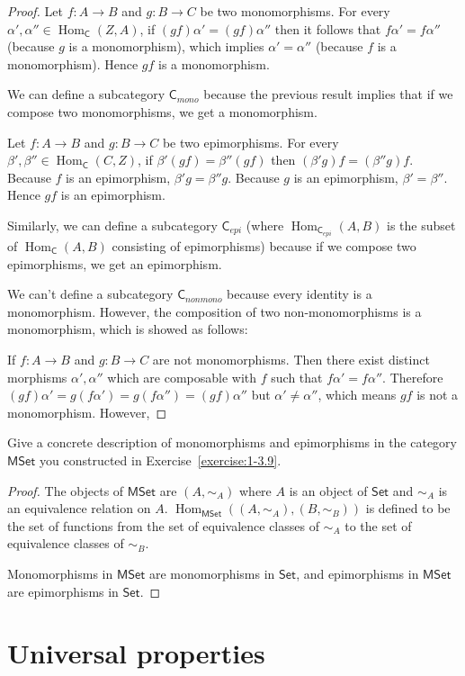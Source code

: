 \begin{proof}
	Let $f: A\to B$ and $g: B\to C$ be two monomorphisms. For every $\alpha', \alpha'' \in \operatorname{Hom}_{\mathsf{C}}(Z, A)$, if $(gf)\alpha' = (gf)\alpha''$ then it follows that $f\alpha' = f\alpha''$ (because $g$ is a monomorphism), which implies $\alpha' = \alpha''$ (because $f$ is a monomorphism). Hence $gf$ is a monomorphism.

	We can define a subcategory $\mathsf{C}_{mono}$ because the previous result implies that if we compose two monomorphisms, we get a monomorphism.

	Let $f: A\to B$ and $g: B\to C$ be two epimorphisms. For every $\beta', \beta'' \in \operatorname{Hom}_{\mathsf{C}}(C, Z)$, if $\beta'(gf) = \beta''(gf)$ then $(\beta'g)f = (\beta''g)f$. Because $f$ is an epimorphism, $\beta'g = \beta''g$. Because $g$ is an epimorphism, $\beta' = \beta''$. Hence $gf$ is an epimorphism.

	Similarly, we can define a subcategory $\mathsf{C}_{epi}$ (where $\operatorname{Hom}_{{\mathsf{C}}_{epi}}(A, B)$ is the subset of $\operatorname{Hom}_{\mathsf{C}}(A, B)$ consisting of epimorphisms) because if we compose two epimorphisms, we get an epimorphism.

	We can't define a subcategory $\mathsf{C}_{nonmono}$ because every identity is a monomorphism. However, the composition of two non-monomorphisms is a monomorphism, which is showed as follows:

	If $f: A\to B$ and $g: B\to C$ are not monomorphisms. Then there exist distinct morphisms $\alpha', \alpha''$ which are composable with $f$ such that $f\alpha' = f\alpha''$. Therefore $(gf)\alpha' = g(f\alpha') = g(f\alpha'') = (gf)\alpha''$ but $\alpha' \ne \alpha''$, which means $gf$ is not a monomorphism. However,
\end{proof}

\begin{exercise}{4.5}
	Give a concrete description of monomorphisms and epimorphisms in the category $\mathsf{MSet}$ you constructed in Exercise~\ref{exercise:1-3.9}.
\end{exercise}

\begin{proof}
	The objects of $\mathsf{MSet}$ are $(A, \sim_{A})$ where $A$ is an object of $\mathsf{Set}$ and $\sim_{A}$ is an equivalence relation on $A$. $\operatorname{Hom}_{\mathsf{MSet}}((A, \sim_{A}), (B, \sim_{B}))$ is defined to be the set of functions from the set of equivalence classes of $\sim_{A}$ to the set of equivalence classes of $\sim_{B}$.

	Monomorphisms in $\mathsf{MSet}$ are monomorphisms in $\mathsf{Set}$, and epimorphisms in $\mathsf{MSet}$ are epimorphisms in $\mathsf{Set}$.
\end{proof}

\section{Universal properties}

